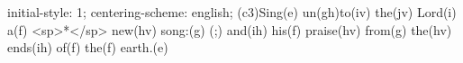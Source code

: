 initial-style: 1;
centering-scheme: english;
(c3)Sing(e) un(gh)to(iv) the(jv) Lord(i) a(f) <sp>*</sp> new(hv) song:(g) (;) and(ih) his(f) praise(hv) from(g) the(hv) ends(ih) of(f) the(f) earth.(e)
